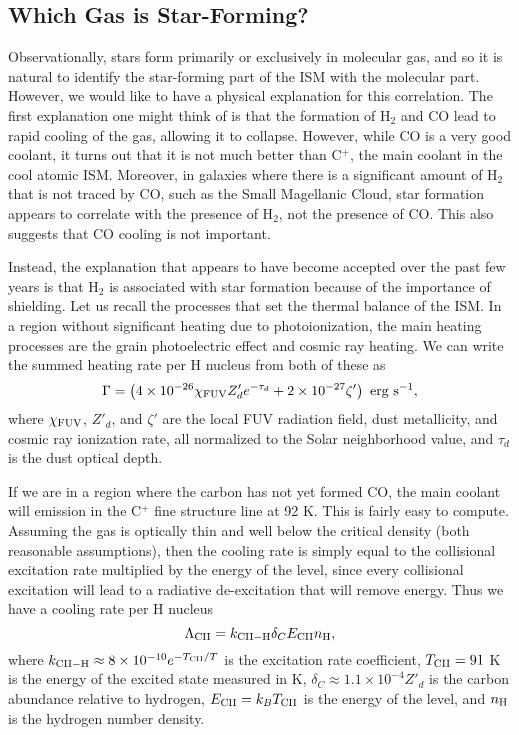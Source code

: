 \subsection{Which Gas is Star-Forming?}

Observationally, stars form primarily or exclusively in molecular gas, and so it is natural to identify the star-forming part of the ISM with the molecular part. However, we would like to have a physical explanation for this correlation. The first explanation one might think of is that the formation of H$_2$ and CO lead to rapid cooling of the gas, allowing it to collapse. However, while CO is a very good coolant, it turns out that it is not much better than C$^+$, the main coolant in the cool atomic ISM. Moreover, in galaxies where there is a significant amount of H$_2$ that is not traced by CO, such as the Small Magellanic Cloud, star formation appears to correlate with the presence of H$_2$, not the presence of CO. This also suggests that CO cooling is not important.

Instead, the explanation that appears to have become accepted over the past few years is that H$_2$ is associated with star formation because of the importance of shielding. Let us recall the processes that set the thermal balance of the ISM. In a region without significant heating due to photoionization, the main heating processes are the grain photoelectric effect and cosmic ray heating. We can write the summed heating rate per H nucleus from both of these as
\begin{equation}
\Gamma = \left(4\times 10^{-26} \chi_{\rm FUV} Z'_d e^{-\tau_d} + 2\times 10^{-27} \zeta'\right) \mbox{ erg s}^{-1},
\end{equation}
where $\chi_{\rm FUV}$, $Z'_d$, and $\zeta'$ are the local FUV radiation field, dust metallicity, and cosmic ray ionization rate, all normalized to the Solar neighborhood value, and $\tau_d$ is the dust optical depth.

If we are in a region where the carbon has not yet formed CO, the main coolant will emission in the C$^+$ fine structure line at 92 K. This is fairly easy to compute. Assuming the gas is optically thin and well below the critical density (both reasonable assumptions), then the cooling rate is simply equal to the collisional excitation rate multiplied by the energy of the level, since every collisional excitation will lead to a radiative de-excitation that will remove energy. Thus we have a cooling rate per H nucleus
\begin{equation}
\Lambda_{\rm CII} = k_{\rm CII-H} \delta_C E_{\rm CII} n_{\rm H},
\end{equation}
where $k_{\rm CII-H} \approx 8\times 10^{-10} e^{-T_{\rm CII}/T}$ is the excitation rate coefficient, $T_{\rm CII} = 91$ K is the energy of the excited state measured in K, $\delta_C\approx 1.1\times 10^{-4} Z'_d$ is the carbon abundance relative to hydrogen, $E_{\rm CII} = k_B T_{\rm CII}$ is the energy of the level, and $n_{\rm H}$ is the hydrogen number density.

